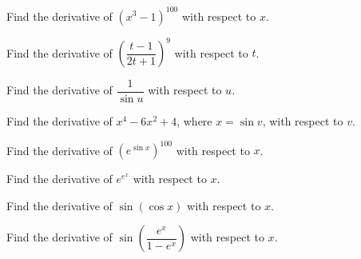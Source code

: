 \documentclass[11pt]{article}
\theoremstyle{break}
\numberwithin{equation}{theorem}
\begin{document}
\begin{example}
    Find the derivative of $\left(x^3-1\right)^{100}$ with respect to $x$.
\end{example}
\vspace{8em}

\begin{example}
    Find the derivative of $\left(\dfrac{t-1}{2t+1}\right)^{9}$ with respect to $t$.
\end{example}
\vspace{8em}

\begin{example}
    Find the derivative of $\dfrac{1}{\sin u}$ with respect to $u$.
\end{example}
\vspace{8em}

\begin{example}
    Find the derivative of $x^4-6x^2+4$, where $x=\sin v$, with respect to $v$.
\end{example}
\vspace{8em}

\begin{example}
    Find the derivative of $\left(e^{\sin x}\right)^{100}$ with respect to $x$.
\end{example}
\vspace{8em}

\begin{example}
    Find the derivative of $e^{e^x}$ with respect to $x$.
\end{example}
\vspace{8em}

\begin{example}
    Find the derivative of $\sin(\cos x)$ with respect to $x$.
\end{example}
\vspace{8em}

\begin{example}
    Find the derivative of $\sin\left(\dfrac{e^x}{1-e^x}\right)$ with respect to $x$.
\end{example}
\vspace{8em}
\end{document}

